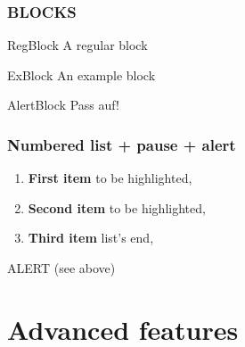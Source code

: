\documentclass{eecslides}
\begin{document}


    \begin{frame}
      \frametitle{BLOCKS}

      \begin{block}{RegBlock}
          A regular block
      \end{block}

      \begin{exampleblock}{ExBlock}
          An example block
      \end{exampleblock}

      \begin{alertblock}{AlertBlock}
        Pass auf!
      \end{alertblock}


    \end{frame}


    \begin{frame}
        \frametitle{Numbered list + pause + alert}

        \begin{large}
        \begin{enumerate}
            \item \textbf{First item} \alert<4>{to be highlighted},
            \pause
            \item \textbf{Second item} \alert<4>{to be highlighted},
            \pause
            \item \textbf{Third item} list's end,
        \end{enumerate}
      \end{large}

        \pause
        \LARGE{ALERT} (see above)

    \end{frame}






    \section{Advanced features}
\end{document}
